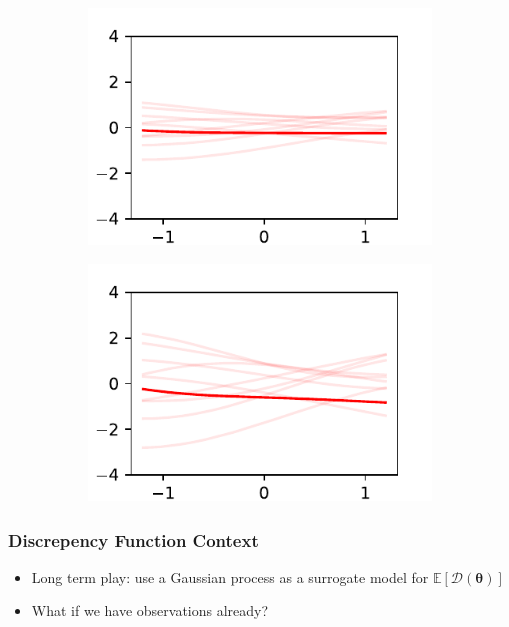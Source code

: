 \documentclass{beamer}
\begin{document}
\begin{frame}
\begin{figure}[htbp]
        \begin{subfigure}[b]{0.4\textwidth}
            \centering
            \includegraphics[width=\textwidth]{GP_ell_20_sigma2_5_tenths.pdf}
            \label{fig:two_half}
        \end{subfigure}%
        \begin{subfigure}[b]{0.4\textwidth}
            \centering
            \includegraphics[width=\textwidth]{GP_ell_20_sigma2_20_tenths.pdf}
            \label{fig:two_two}
        \end{subfigure}
    \end{figure}
\end{frame}

\begin{frame}
    \frametitle{Discrepency Function Context}
    \begin{itemize}
        \item Long term play: use a Gaussian process as a surrogate model for
              $\mathbb{E}[\mathcal{D}(\bm{\theta})]$
        \item <2-> What if we have observations already?
    \end{itemize}

\end{frame}
\end{document}
